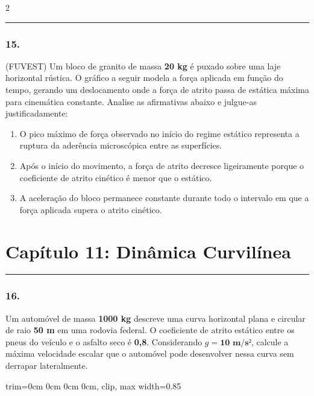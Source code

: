 \documentclass[twoside, 10pt, a4paper]{article}
\newlength{\espacoPosTitulo}\setlength{\espacoPosTitulo}{0.3cm}
\newlength{\espacoPreQuestao}\setlength{\espacoPreQuestao}{0.1cm}
\newlength{\espacoQuestao}\setlength{\espacoQuestao}{0.2cm}
\newlength{\espacoAlt}\setlength{\espacoAlt}{0.2cm}
\newcommand{\larguraTikz}{0.85\linewidth}
\begin{document}
\begin{multicols*}{2}
\noindent\textcolor{CorLinha}{\rule{\linewidth}{0.5pt}} 
\par\vspace{\espacoPreQuestao}
\subsubsection*{15.} (FUVEST) Um bloco de granito de massa \textbf{20 kg} é puxado sobre uma laje horizontal rústica. O gráfico a seguir modela a força aplicada em função do tempo, gerando um deslocamento onde a força de atrito passa de estática máxima para cinemática constante. Analise as afirmativas abaixo e julgue-as justificadamente:

\begin{enumerate}[label=\Roman*., itemsep=\espacoAlt]
    \item O pico máximo de força observado no início do regime estático representa a ruptura da aderência microscópica entre as superfícies.
    \item Após o início do movimento, a força de atrito decresce ligeiramente porque o coeficiente de atrito cinético é menor que o estático.
    \item A aceleração do bloco permanece constante durante todo o intervalo em que a força aplicada supera o atrito cinético.
\end{enumerate}
\par\vspace{\espacoQuestao}

\section*{Capítulo 11: Dinâmica Curvilínea}
\vspace{-0.2cm}\noindent\rule{\linewidth}{1.5pt} 
\par\vspace{\espacoPosTitulo}
\subsubsection*{16.} Um automóvel de massa \textbf{1000 kg} descreve uma curva horizontal plana e circular de raio \textbf{50 m} em uma rodovia federal. O coeficiente de atrito estático entre os pneus do veículo e o asfalto seco é \textbf{0,8}. Considerando $g = \textbf{10 m/s²}$, calcule a máxima velocidade escalar que o automóvel pode desenvolver nessa curva sem derrapar lateralmente.

\begin{center}
\begin{adjustbox}{trim=0cm 0cm 0cm 0cm, clip, max width=\larguraTikz}
\end{adjustbox}
\end{center}
\end{multicols*}
\end{document}
